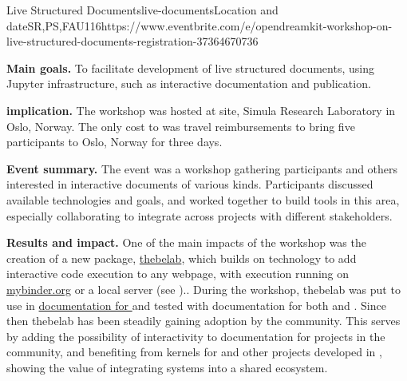 \begin{event}{Live Structured Documents}{live-documents}{Location and date}{SR,PS,FAU}{11}{6}{https://www.eventbrite.com/e/opendreamkit-workshop-on-live-structured-documents-registration-37364670736}

\textbf{Main goals.} To facilitate development of live structured documents, using Jupyter infrastructure, such as interactive documentation and publication.

\textbf{\ODK implication.}
The workshop was hosted at \ODK site, Simula Research Laboratory in Oslo, Norway. The only cost to \ODK was travel reimbursements to bring five participants to Oslo, Norway for three days.

\textbf{Event summary.} The event was a workshop gathering \ODK participants and others interested in interactive documents of various kinds.
Participants discussed available technologies and goals,
and worked together to build tools in this area,
especially collaborating to integrate across projects with different stakeholders.

\textbf{Results and impact.}
One of the main impacts of the workshop
was the creation of a new package, \href{https://github.com/minrk/thebelab}{thebelab},
which builds on \Jupyter technology
to add interactive code execution to any webpage,
with execution running on \href{https://mybinder.org}{mybinder.org} or a local \Jupyter server
(see )..
During the workshop, thebelab was put to use in \href{https://more-sagemath-tutorials.readthedocs.io/en/latest/}{documentation for
\Sage} and tested with documentation for both \Singular and \GAP.
Since then thebelab has been steadily gaining adoption by the community.
This serves  by adding the possibility of interactivity to documentation for projects in the \ODK community,
and benefiting from kernels for \GAP and other \ODK projects developed in ,
showing the value of integrating \ODK systems into a shared \Jupyter ecosystem.

\end{event}
